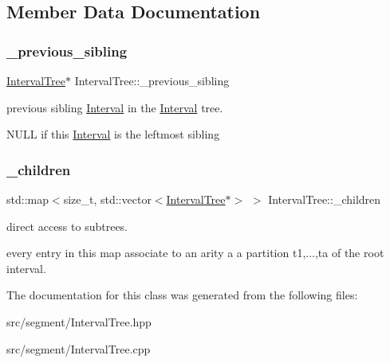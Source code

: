 \subsection{Member Data Documentation}
\mbox{\label{classIntervalTree_a36b39cfc069e75085d3471b73e7c0d8d}} 
\subsubsection{\texorpdfstring{\_previous\_sibling}{\_previous\_sibling}}
{\footnotesize\ttfamily \mbox{\hyperlink{classIntervalTree}{Interval\+Tree}}$\ast$ Interval\+Tree\+::\+\_\+previous\+\_\+sibling\hspace{0.3cm}{\ttfamily [protected]}}



previous sibling \mbox{\hyperlink{classInterval}{Interval}} in the \mbox{\hyperlink{classInterval}{Interval}} tree. 

N\+U\+LL if this \mbox{\hyperlink{classInterval}{Interval}} is the leftmost sibling \mbox{\label{classIntervalTree_ab33b66f644ed154e05a69c13e979f1cd}} 
\subsubsection{\texorpdfstring{\_children}{\_children}}
{\footnotesize\ttfamily std\+::map$<$size\+\_\+t, std\+::vector$<$\mbox{\hyperlink{classIntervalTree}{Interval\+Tree}}$\ast$$>$ $>$ Interval\+Tree\+::\+\_\+children\hspace{0.3cm}{\ttfamily [protected]}}



direct access to subtrees. 

every entry in this map associate to an arity a a partition t1,...,ta of the root interval. 

The documentation for this class was generated from the following files\+:\begin{DoxyCompactItemize}
\item 
src/segment/Interval\+Tree.\+hpp\item 
src/segment/Interval\+Tree.\+cpp\end{DoxyCompactItemize}

